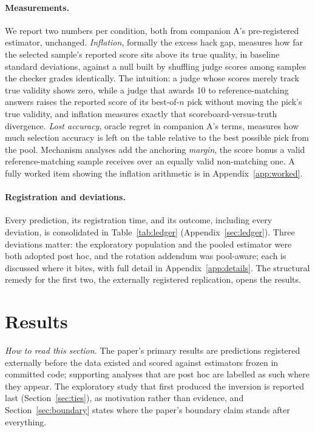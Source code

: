 \documentclass[11pt]{article}
\begin{document}
\paragraph{Measurements.}
We report two numbers per condition, both from companion A's pre-registered estimator, unchanged.
\emph{Inflation}, formally the excess hack gap, measures how far the selected sample's reported score sits above its true quality, in baseline standard deviations, against a null built by shuffling judge scores among samples the checker grades identically.
The intuition: a judge whose scores merely track true validity shows zero, while a judge that awards 10 to reference-matching answers raises the reported score of its best-of-$n$ pick without moving the pick's true validity, and inflation measures exactly that scoreboard-versus-truth divergence.
\emph{Lost accuracy}, oracle regret in companion A's terms, measures how much selection accuracy is left on the table relative to the best possible pick from the pool.
Mechanism analyses add the anchoring \emph{margin}, the score bonus a valid reference-matching sample receives over an equally valid non-matching one.
A fully worked item showing the inflation arithmetic is in Appendix~\ref{app:worked}.

\paragraph{Registration and deviations.}
Every prediction, its registration time, and its outcome, including every deviation, is consolidated in Table~\ref{tab:ledger} (Appendix~\ref{sec:ledger}).
Three deviations matter: the exploratory population and the pooled estimator were both adopted post hoc, and the rotation addendum was pool-aware; each is discussed where it bites, with full detail in Appendix~\ref{app:details}.
The structural remedy for the first two, the externally registered replication, opens the results.

\section{Results}

\emph{How to read this section.}
The paper's primary results are predictions registered externally before the data existed and scored against estimators frozen in committed code; supporting analyses that are post hoc are labelled as such where they appear.
The exploratory study that first produced the inversion is reported last (Section~\ref{sec:ties}), as motivation rather than evidence, and Section~\ref{sec:boundary} states where the paper's boundary claim stands after everything.
\end{document}
